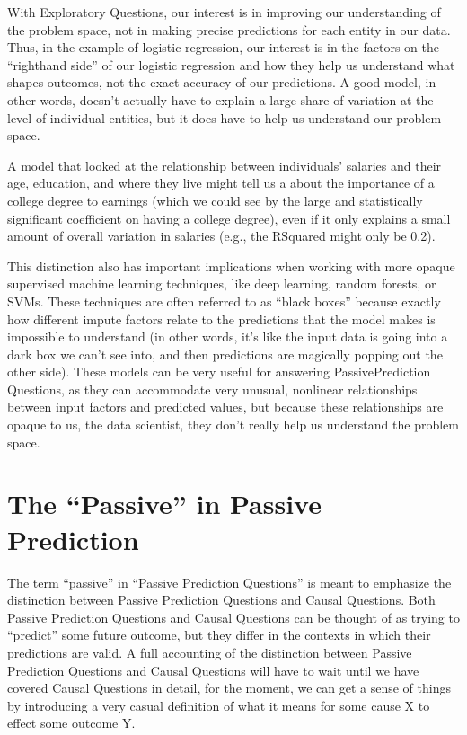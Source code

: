 \documentclass[letterpaper,10pt,english]{jupyterBook}
\begin{document}
\sphinxAtStartPar
With Exploratory Questions, our interest is in improving our understanding of the problem space, not in making precise predictions for each entity in our data. Thus, in the example of logistic regression, our interest is in the factors on the “right\sphinxhyphen{}hand side” of our logistic regression and how they help us understand what shapes outcomes, not the exact accuracy of our predictions. A good model, in other words, doesn’t actually have to explain a large share of variation at the level of individual entities, but it does have to help us understand our problem space.

\sphinxAtStartPar
A model that looked at the relationship between individuals’ salaries and their age, education, and where they live might tell us a  about the importance of a college degree to earnings (which we could see by the large and statistically significant coefficient on having a college degree), even if it only explains a small amount of overall variation in salaries (e.g., the R\sphinxhyphen{}Squared might only be 0.2).

\sphinxAtStartPar
This distinction also has important implications when working with more opaque supervised machine learning techniques, like deep learning, random forests, or SVMs. These techniques are often referred to as “black boxes” because exactly how different impute factors relate to the predictions that the model makes is impossible to understand (in other words, it’s like the input data is going into a dark box we can’t see into, and then predictions are magically popping out the other side). These models can be very useful for answering Passive\sphinxhyphen{}Prediction Questions, as they can accommodate very unusual, non\sphinxhyphen{}linear relationships between input factors and predicted values, but because these relationships are opaque to us, the data scientist, they don’t really help us understand the problem space.


\section{The “Passive” in Passive Prediction}
\label{\detokenize{30_questions/20_using_passive_prediction_questions:the-passive-in-passive-prediction}}
\sphinxAtStartPar
The term “passive” in “Passive Prediction Questions” is meant to emphasize the distinction between Passive Prediction Questions and Causal Questions. Both Passive Prediction Questions and Causal Questions can be thought of as trying to “predict” some future outcome, but they differ in the contexts in which their predictions are valid. A full accounting of the distinction between Passive Prediction Questions and Causal Questions will have to wait until we have covered Causal Questions in detail, for the moment, we can get a sense of things by introducing a very casual definition of what it means for some cause X to effect some outcome Y.
\end{document}
